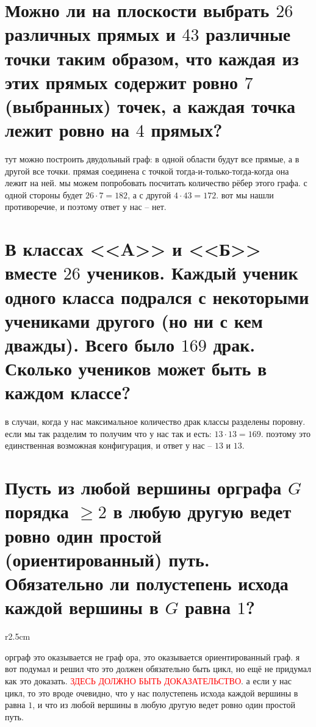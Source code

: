 \documentclass{article}
\begin{document}
  \section{Можно ли на плоскости выбрать $26$ различных прямых и $43$ различные точки таким образом, что каждая из этих прямых содержит ровно $7$ (выбранных) точек, а каждая точка лежит ровно на $4$ прямых?}
  тут можно построить двудольный граф:
  в одной области будут все прямые, а в другой все точки.
  прямая соединена с точкой тогда-и-только-тогда-когда она лежит на ней.
  мы можем попробовать посчитать количество рёбер этого графа.
  с одной стороны будет $26 \cdot 7 = 182$, а с другой $4 \cdot 43 = 172$.
  вот мы нашли противоречие, и поэтому ответ у нас -- нет.

  \section{В классах <<A>> и <<Б>> вместе $26$ учеников. Каждый ученик одного класса подрался с некоторыми учениками другого (но ни с кем дважды). Всего было $169$ драк. Сколько учеников может быть в каждом классе?}
  в случаи, когда у нас максимальное количество драк классы разделены поровну.
  если мы так разделим то получим что у нас так и есть: $13 \cdot 13 = 169$.
  поэтому это единственная возможная конфигурация, и ответ у нас -- $13$ и $13$.

  \section{Пусть из любой вершины орграфа $G$ порядка $\geq 2$ в любую другую ведет ровно один простой (ориентированный) путь. Обязательно ли полустепень исхода каждой вершины в $G$ равна $1$?}
  \begin{wrapfigure}{r}{2.5cm}
    \vspace{-1cm}
    \vspace{-1cm}
  \end{wrapfigure}
  орграф это оказывается не граф ора, это оказывается ориентированный граф.
  я вот подумал и решил что это должен обязательно быть цикл, но ещё не придумал как это доказать.
  \textcolor{red}{ЗДЕСЬ ДОЛЖНО БЫТЬ ДОКАЗАТЕЛЬСТВО}.
  а если у нас цикл, то это вроде очевидно, что у нас полустепень исхода каждой вершины в равна $1$,
  и что из любой вершины в любую другую ведет ровно один простой путь.
\end{document}

